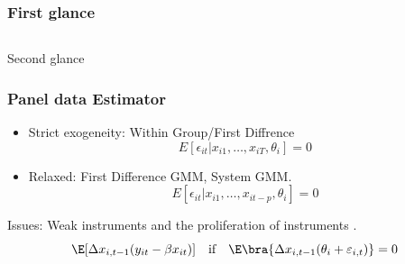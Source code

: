 \documentclass[10pt, aspectratio=169]{beamer}
\begin{document}
\begin{frame}
  \frametitle{First glance}
  \begin{columns}[T,T]
    \makebox[\textwidth][c]{
      \fontsize{5pt}{4pt} \selectfont
      }

    \makebox[\textwidth][c]{
      \fontsize{5pt}{4pt} \selectfont
      }

  \end{columns}
\end{frame}

\begin{frame}[label=reg_sep]{Second glance}
  \begin{table}
    \fontsize{6pt}{4pt}\selectfont
    
  \end{table}
  \hyperlink{output}{}
\end{frame}

\begin{frame}
  \frametitle{Panel data Estimator}
  \begin{itemize}\itemsep=12pt
    \item Strict exogeneity: Within Group/First Diffrence
          \begin{equation*}
            E[\epsilon_{it}|x_{i1},\ldots, x_{iT},\theta_i]=0
          \end{equation*}
    \item Relaxed: First Difference GMM, System GMM.
          \begin{equation*}
            E[\epsilon_{it}|x_{i1},\ldots, x_{it-p},\theta_i]=0
          \end{equation*}
  \end{itemize}

  Issues: Weak instruments \citep{blundell1998initial} and the proliferation of
  instruments \citep{roodman2007short}.
  \begin{equation*}
    \E[\Delta x_{i,t-1}(y_{it}-\beta x_{it})] \quad \text{if}\quad \E\bra{\Delta x_{i,t-1}(\theta_i+\varepsilon_{i,t})}=0
  \end{equation*}
\end{frame}
\end{document}
